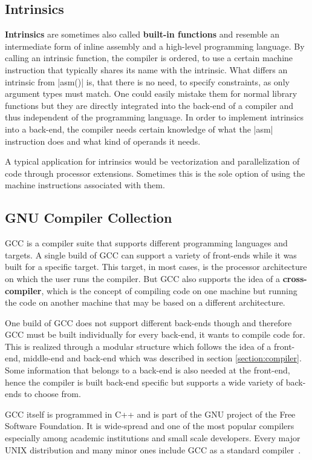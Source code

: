 {\subsection{Intrinsics}
\textbf{Intrinsics} are sometimes also called \textbf{built-in functions} and resemble an intermediate form of inline assembly and a high-level programming language.
By calling an intrinsic function, the compiler is ordered, to use a certain machine instruction that typically shares its name with the intrinsic.
What differs an intrinsic from |asm()| is, that there is no need, to specify constraints, as only argument types must match.
One could easily mistake them for normal library functions but they are directly integrated into the back-end of a compiler and thus independent of the programming language.
In order to implement intrinsics into a back-end, the compiler needs certain knowledge of what the |asm| instruction does and what kind of operands it needs.

A typical application for intrinsics would be vectorization and parallelization of code through processor extensions.
Sometimes this is the sole option of using the machine instructions associated with them.

\subsection{GNU Compiler Collection}
\label{sec:GCC}
\ac{GCC} is a compiler suite that supports different programming languages and targets.
A single build of \ac{GCC} can support a variety of front-ends while it was built for a specific target.
This target, in most cases, is the processor architecture on which the user runs the compiler.
But \ac{GCC} also supports the idea of a \textbf{cross-compiler}, which is the concept of compiling code on one machine but running the code on another machine that may be based on a different architecture.

One build of \ac{GCC} does not support different back-ends though and therefore \ac{GCC} must be built individually for every back-end, it wants to compile code for.
This is realized through a modular structure which follows the idea of a front-end, middle-end and back-end which was described in section \ref{section:compiler}.
Some information that belongs to a back-end is also needed at the front-end, hence the compiler is built back-end specific but supports a wide variety of back-ends to choose from.

\ac{GCC} itself is programmed in C++ and is part of the GNU project of the Free Software Foundation.
It is wide-spread and one of the most popular compilers especially among academic institutions and small scale developers.
Every major UNIX distribution and many minor ones include \ac{GCC} as a standard compiler~\cite{definitveGCCGuide:introduction}.

}
